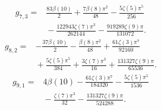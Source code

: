 \begin{align*}g_{7,3}={}&\frac{83 \beta(10)}{2}+\frac{7 \beta(8) \pi^{2}}{48}- \frac{5 \zeta(5) \pi^{5}}{256}\\
&{}- \frac{122943 \zeta(7) \pi^{3}}{262144}- \frac{919289 \zeta(9) \pi}{131072}.\end{align*}
\begin{align*}g_{8,2}={}&- \frac{37 \beta(10)}{2}- \frac{\beta(8) \pi^{2}}{48}+\frac{61 \zeta(3) \pi^{7}}{92160}\\
&{}+\frac{5 \zeta(5) \pi^{5}}{384}+\frac{3 \zeta(7) \pi^{3}}{16}+\frac{131327 \zeta(9) \pi}{65536}.\end{align*}
\begin{align*}g_{9,1}={}&4 \beta(10)- \frac{61 \zeta(3) \pi^{7}}{184320}- \frac{5 \zeta(5) \pi^{5}}{1536}\\
&{}- \frac{\zeta(7) \pi^{3}}{32}- \frac{131327 \zeta(9) \pi}{524288}.\end{align*}
